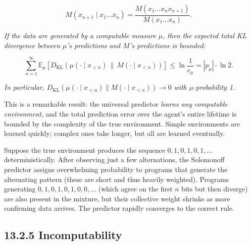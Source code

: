 \[
M(x_{n+1} \mid x_1 \ldots x_n) = \frac{M(x_1 \ldots x_n x_{n+1})}{M(x_1 \ldots x_n)}.
\]

\begin{theorem}
\textit{If the data are generated by a computable measure $\mu$, then the expected total KL divergence between $\mu$'s predictions and $M$'s predictions is bounded:}

\[
\sum_{n=1}^{\infty} \mathbb{E}_\mu \left[ D_{\mathrm{KL}}\!\left(\mu(\cdot \mid x_{<n}) \,\|\, M(\cdot \mid x_{<n})\right) \right] \leq \ln \frac{1}{c_\mu} = |p_\mu| \cdot \ln 2.
\]

\textit{In particular, $D_{\mathrm{KL}}(\mu(\cdot \mid x_{<n}) \| M(\cdot \mid x_{<n})) \to 0$ with $\mu$-probability 1.}

This is a remarkable result: the universal predictor \textit{learns any computable environment}, and the total prediction error over the agent's entire lifetime is bounded by the complexity of the true environment. Simple environments are learned quickly; complex ones take longer, but all are learned eventually.
\end{theorem}

\begin{example}
Suppose the true environment produces the sequence $0, 1, 0, 1, 0, 1, \ldots$ deterministically. After observing just a few alternations, the Solomonoff predictor assigns overwhelming probability to programs that generate the alternating pattern (these are short and thus heavily weighted). Programs generating $0,1,0,1,0,1,0,0,...$ (which agree on the first $n$ bits but then diverge) are also present in the mixture, but their collective weight shrinks as more confirming data arrives. The predictor rapidly converges to the correct rule.
\end{example}

\subsection{13.2.5 Incomputability}

